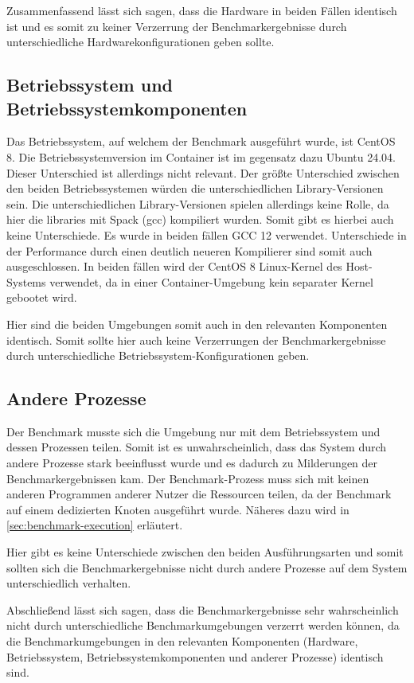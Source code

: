 Zusammenfassend lässt sich sagen, dass die Hardware in beiden Fällen identisch ist und es somit zu keiner Verzerrung der Benchmarkergebnisse durch unterschiedliche Hardwarekonfigurationen geben sollte. 

\subsection{Betriebssystem und Betriebssystemkomponenten}

Das Betriebssystem, auf welchem der Benchmark ausgeführt wurde, ist CentOS 8. Die Betriebssystemversion im Container ist im gegensatz dazu Ubuntu 24.04. Dieser Unterschied ist allerdings nicht relevant. Der größte Unterschied zwischen den beiden Betriebssystemen würden die unterschiedlichen Library-Versionen sein. Die unterschiedlichen Library-Versionen spielen allerdings keine Rolle, da hier die libraries mit Spack (gcc) kompiliert wurden. Somit gibt es hierbei auch keine Unterschiede. Es wurde in beiden fällen GCC 12 verwendet. Unterschiede in der Performance durch einen deutlich neueren Kompilierer sind somit auch ausgeschlossen. In beiden fällen wird der CentOS 8 Linux-Kernel des Host-Systems verwendet, da in einer Container-Umgebung kein separater Kernel gebootet wird.

Hier sind die beiden Umgebungen somit auch in den relevanten Komponenten identisch. Somit sollte hier auch keine Verzerrungen der Benchmarkergebnisse durch unterschiedliche Betriebssystem-Konfigurationen geben.

\subsection{Andere Prozesse}

Der Benchmark musste sich die Umgebung nur mit dem Betriebssystem und dessen Prozessen teilen. Somit ist es unwahrscheinlich, dass das System durch andere Prozesse stark beeinflusst wurde und es dadurch zu Milderungen der Benchmarkergebnissen kam. Der Benchmark-Prozess muss sich mit keinen anderen Programmen anderer Nutzer die Ressourcen teilen, da der Benchmark auf einem dedizierten Knoten ausgeführt wurde. Näheres dazu wird in \cref{sec:benchmark-execution} erläutert.

Hier gibt es keine Unterschiede zwischen den beiden Ausführungsarten und somit sollten sich die Benchmarkergebnisse nicht durch andere Prozesse auf dem System unterschiedlich verhalten.

Abschließend lässt sich sagen, dass die Benchmarkergebnisse sehr wahrscheinlich nicht durch unterschiedliche Benchmarkumgebungen verzerrt werden können, da die Benchmarkumgebungen in den relevanten Komponenten (Hardware, Betriebssystem, Betriebssystemkomponenten und anderer Prozesse) identisch sind.   

